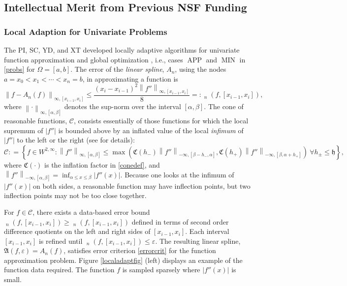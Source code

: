\documentclass[11pt]{NSFamsart}
\newcommand{\hcut}{\mathfrak{h}}
\DeclareMathOperator{\err}{err}
\DeclareMathOperator{\oerr}{\overline{\err}}
\DeclareMathOperator{\herr}{\widehat{\err}}
\DeclareMathOperator{\APP}{APP}
\DeclareMathOperator{\OPT}{MIN}
\newcommand{\cc}{\mathcal{C}}
\newcommand{\fA}{\mathfrak{A}}
\newcommand{\fC}{\mathfrak{C}}
\def\abs#1{\ensuremath{\left \lvert #1 \right \rvert}}
\newcommand{\norm}[2][{}]{\ensuremath{\left \lVert #2 \right \rVert}_{#1}}
\begin{document}
\subsection{Intellectual Merit from Previous NSF Funding}
\label{previousmeritsubsec}

\subsubsection{Local Adaption for Univariate Problems} \label{localadpatsec}
The PI, SC, YD, and XT developed 
locally adaptive 
algorithms for univariate function 
approximation and 
global optimization \cite{ChoEtal17a,Din15a}, i.e., cases $\APP$ and $\OPT$ in 
\eqref{probs} for $\Omega = [a,b]$.  
The error of the \emph{linear spline}, $A_n$, using the 
nodes $a = x_0 < x_1 < \cdots < x_n = b$,  in approximating a function is 
\begin{equation} \label{linsplineerror}
\norm[{\infty,[x_{i-1},x_i]}]{f - 
	A_n(f)} \le \frac{(x_i-x_{i-1})^2\norm[\infty,{[x_{i-1},x_i]}]{f''}}{8} =: \oerr_n(f,[x_{i-1},x_i]),
\end{equation}
where $\norm[{\infty,[\alpha,\beta]}]{\cdot}$ denotes the sup-norm over the interval 
$[\alpha,\beta]$.  The cone of reasonable functions, $\cc$, consists essentially of those 
functions for 
which the local supremum of $|f''|$ is bounded above by an inflated value of the local 
\emph{infimum} 
of $|f''|$ to the left or the right (see \cite{ChoEtal17a} for details):
\[
\cc: = \left \{ f \in W^{2,\infty} : \norm[{\infty,[\alpha,\beta]}]{f''} \le \max\left(\fC(h_{-}) 
\norm[-\infty,{[\beta-h_-,\alpha]}]{f''},\fC(h_{+})
\norm[-\infty,{[\beta, \alpha+h_+]}]{f''}\right) \  \forall h_{\pm} \le \hcut \right\},
\]
where $\fC(\cdot)$ is the inflation factor in \eqref{conedef}, and $\norm[-\infty,{[\alpha, 
\beta]}]{f''} = \inf_{\alpha \le x \le \beta} \abs{f''(x)}$.  Because one looks at the infimum of $|f''(x)|$ 
on 
both sides, 
a reasonable function may have inflection points, but two inflection points may not be too 
close together.  

For $f \in \cc$, there exists a data-based error bound 
$\herr_n(f,[x_{i-1},x_i]) \ge \oerr_n(f,[x_{i-1},x_i])$ defined in terms of second order 
difference 
quotients on the 
left and right sides of $[x_{i-1},x_i]$.  Each interval $[x_{i-1},x_i]$ is refined until  
$\herr_n(f,[x_{i-1},x_i]) \le \varepsilon$.  The resulting linear spline, $\fA(f,\varepsilon)  = A_n(f)$, 
satisfies 
error 
criterion \eqref{errorcrit} for the function approximation problem. Figure 
\ref{localadaptfig} (left) displays an example of the function data required.  The function $f$ is 
sampled sparsely where $|f''(x)|$ is small.
\end{document}
